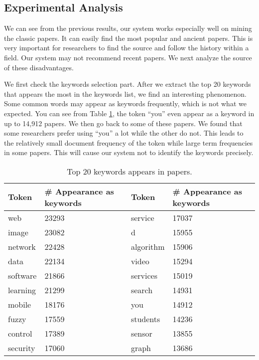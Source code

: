 \subsection{Experimental Analysis}

We can see from the previous results, our system works especially well on mining the classic papers. It can easily find the most popular and ancient papers. This is very important for researchers to find the source and follow the history within a field. Our system may not recommend recent papers. We next analyze the source of these disadvantages.

We first check the keywords selection part. After we extract the top 20 keywords that appears the most in the keywords list, we find an interesting phenomenon. Some common words may appear as keywords frequently, which is not what we expected. You can see from Table \ref{res:tfidf}, the token ``you'' even appear as a keyword in up to 14,912 papers. We then go back to some of these papers. We found that some researchers prefer using ``you'' a lot while the other do not. This leads to the relatively small document frequency of the token while large term frequencies in some papers. This will cause our system not to identify the keywords precisely.

\begin{table}
	\centering
	\begin{tabular}{lp{2.5cm}lp{2.5cm}}
		\toprule
		\textbf{Token}		& \textbf{\# Appearance as keywords} &\textbf{Token}		& \textbf{\# Appearance as keywords} \\ \midrule
		web	&23293 &service&17037\\
		image &23082&d&15955\\
		network &22428&algorithm&15906\\
		data &22134&video&15294\\
		software &21866 &services&15019\\
		learning &21299&search&14931\\
		mobile &18176&you&14912\\
		fuzzy &17559&students&14236\\
		control &17389&sensor&13855\\
		security & 17060&graph&13686\\
		\bottomrule
	\end{tabular}
	\vspace{3mm}
	\caption{Top 20 keywords appears in papers. }
	\label{res:tfidf}
\end{table}

